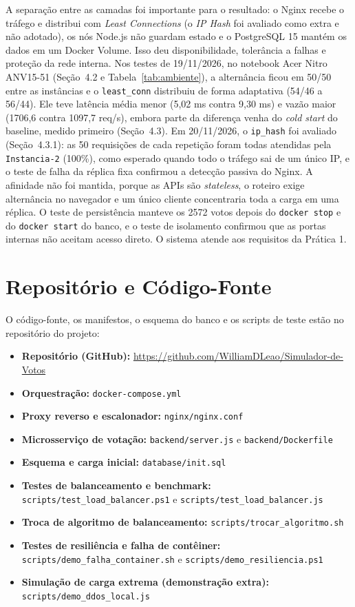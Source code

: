 \documentclass[12pt,a4paper]{article}
\begin{document}
A separação entre as camadas foi importante para o resultado: o Nginx recebe o tráfego e distribui com \textit{Least Connections} (o \textit{IP Hash} foi avaliado como extra e não adotado), os nós Node.js não guardam estado e o PostgreSQL 15 mantém os dados em um Docker Volume. Isso deu disponibilidade, tolerância a falhas e proteção da rede interna. Nos testes de 19/11/2026, no notebook Acer Nitro ANV15-51 (Seção~4.2 e Tabela~\ref{tab:ambiente}), a alternância ficou em 50/50 entre as instâncias e o \texttt{least\_conn} distribuiu de forma adaptativa (54/46 a 56/44). Ele teve latência média menor (5,02 ms contra 9,30 ms) e vazão maior (1706,6 contra 1097,7 req/s), embora parte da diferença venha do \textit{cold start} do baseline, medido primeiro (Seção~4.3). Em 20/11/2026, o \texttt{ip\_hash} foi avaliado (Seção~4.3.1): as 50 requisições de cada repetição foram todas atendidas pela \texttt{Instancia-2} (100\%), como esperado quando todo o tráfego sai de um único IP, e o teste de falha da réplica fixa confirmou a detecção passiva do Nginx. A afinidade não foi mantida, porque as APIs são \textit{stateless}, o roteiro exige alternância no navegador e um único cliente concentraria toda a carga em uma réplica. O teste de persistência manteve os 2572 votos depois do \texttt{docker stop} e do \texttt{docker start} do banco, e o teste de isolamento confirmou que as portas internas não aceitam acesso direto. O sistema atende aos requisitos da Prática 1.

\section{Repositório e Código-Fonte}
O código-fonte, os manifestos, o esquema do banco e os scripts de teste estão no repositório do projeto:
\begin{itemize}
    \item \textbf{Repositório (GitHub):} \url{https://github.com/WilliamDLeao/Simulador-de-Votos}
    \item \textbf{Orquestração:} \texttt{docker-compose.yml}
    \item \textbf{Proxy reverso e escalonador:} \texttt{nginx/nginx.conf}
    \item \textbf{Microsserviço de votação:} \texttt{backend/server.js} e \texttt{backend/Dockerfile}
    \item \textbf{Esquema e carga inicial:} \texttt{database/init.sql}
    \item \textbf{Testes de balanceamento e benchmark:} \texttt{scripts/test\_load\_balancer.ps1} e \texttt{scripts/test\_load\_balancer.js}
    \item \textbf{Troca de algoritmo de balanceamento:} \texttt{scripts/trocar\_algoritmo.sh}
    \item \textbf{Testes de resiliência e falha de contêiner:} \texttt{scripts/demo\_falha\_container.sh} e \texttt{scripts/demo\_resiliencia.ps1}
    \item \textbf{Simulação de carga extrema (demonstração extra):} \texttt{scripts/demo\_ddos\_local.js}
\end{itemize}
\end{document}

